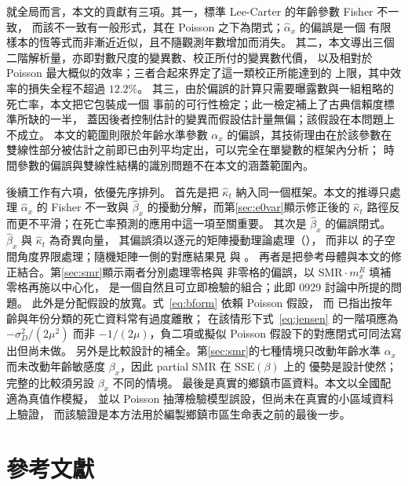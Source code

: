 \documentclass[UTF8, fontset=macnew, a4paper, 12pt]{ctexart}
\begin{document}
就全局而言，本文的貢獻有三項。其一，標準 Lee-Carter 的年齡參數 Fisher 不一致，
而該不一致有一般形式，其在 Poisson 之下為閉式；$\hat\alpha_x$ 的偏誤是一個
有限樣本的恆等式而非漸近近似，且不隨觀測年數增加而消失。
其二，本文導出三個二階解析量，亦即對數尺度的變異數、校正所付的變異數代價，
以及相對於 Poisson 最大概似的效率；三者合起來界定了這一類校正所能達到的
上限，其中效率的損失全程不超過 $12.2\%$。
其三，由於偏誤的計算只需要曝露數與一組粗略的死亡率，本文把它包裝成一個
事前的可行性檢定；此一檢定補上了古典信賴度標準所缺的一半，
蓋因後者控制估計的變異而假設估計量無偏；該假設在本問題上不成立。
本文的範圍則限於年齡水準參數 $\alpha_x$ 的偏誤，其技術理由在於該參數在
雙線性部分被估計之前即已由列平均定出，可以完全在單變數的框架內分析；
時間參數的偏誤與雙線性結構的識別問題不在本文的涵蓋範圍內。



後續工作有六項，依優先序排列。
首先是把 $\hat\kappa_t$ 納入同一個框架。本文的推導只處理 $\hat\alpha_x$ 的
Fisher 不一致與 $\hat\beta_x$ 的擾動分解，而第\ref{sec:e0var}顯示修正後的
$\hat\kappa_t$ 路徑反而更不平滑；在死亡率預測的應用中這一項至關重要。
其次是 $\hat\beta_x$ 的偏誤閉式。$\hat\beta_x$ 與 $\hat\kappa_t$ 為奇異向量，
其偏誤須以逐元的矩陣擾動理論處理（\citealp{abbe2020}），
而非以 \citet{caizhang2018} 的子空間角度界限處理；隨機矩陣一側的對應結果見 \citet{benaych2012} 與 \citet{zhang2022}。
再者是把參考母體與本文的修正結合。第\ref{sec:smr}顯示兩者分別處理零格與
非零格的偏誤，以 $\mathrm{SMR}\cdot m^{R}_x$ 填補零格再施以中心化，
是一個自然且可立即檢驗的組合；此即 0929 討論中所提的問題。
此外是分配假設的放寬。式~\eqref{eq:bform} 依賴 Poisson 假設，
而 \citet{djeundje2010}已指出按年齡與年份分類的死亡資料常有過度離散；
在該情形下式~\eqref{eq:jensen} 的一階項應為 $-\sigma_D^2/(2\mu^2)$
而非 $-1/(2\mu)$，負二項或擬似 Poisson 假設下的對應閉式可同法寫出但尚未做。
另外是比較設計的補全。第\ref{sec:smr}的七種情境只改動年齡水準 $\alpha_x$
而未改動年齡敏感度 $\beta_x$，因此 partial SMR 在 $\mathrm{SSE}(\beta)$ 上的
優勢是設計使然；完整的比較須另設 $\beta_x$ 不同的情境。
最後是真實的鄉鎮市區資料。本文以全國配適為真值作模擬，
並以 Poisson 抽薄檢驗模型誤設，但尚未在真實的小區域資料上驗證，
而該驗證是本方法用於編製鄉鎮市區生命表之前的最後一步。


\section*{參考文獻}
\end{document}
